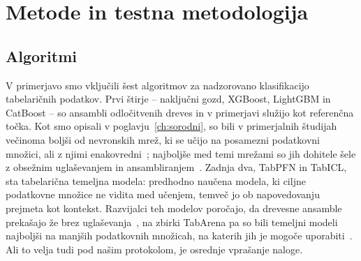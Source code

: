 \documentclass[a4paper,12pt,openright]{book}
\begin{document}

\chapter{Metode in testna metodologija}
\label{ch:metode}

\section{Algoritmi}
\label{sec:algoritmi}

V primerjavo smo vključili šest algoritmov za nadzorovano klasifikacijo
tabelaričnih podatkov. Prvi štirje -- naključni gozd, XGBoost, LightGBM in
CatBoost -- so ansambli odločitvenih dreves in v primerjavi služijo kot
referenčna točka. Kot smo opisali v poglavju~\ref{ch:sorodni}, so bili v
primerjalnih študijah večinoma boljši od nevronskih mrež, ki se učijo na
posamezni podatkovni množici, ali z njimi
enakovredni~\cite{grinsztajn2022why,mcelfresh2023neural}; najboljše med temi
mrežami so jih dohitele šele z obsežnim uglaševanjem in
ansambliranjem~\cite{erickson2025tabarena}. Zadnja dva, TabPFN in
TabICL, sta tabelarična temeljna modela: predhodno naučena modela, ki ciljne podatkovne množice ne vidita med
učenjem, temveč jo ob napovedovanju prejmeta kot kontekst. Razvijalci teh
modelov poročajo, da drevesne ansamble prekašajo že brez
uglaševanja~\cite{grinsztajn2025tabpfn25,grinsztajn2026tabpfn3,qu2025tabicl},
na zbirki TabArena pa so bili temeljni modeli najboljši na manjših
podatkovnih množicah, na katerih jih je mogoče
uporabiti~\cite{erickson2025tabarena}. Ali to velja tudi pod našim
protokolom, je osrednje vprašanje naloge.
\end{document}

